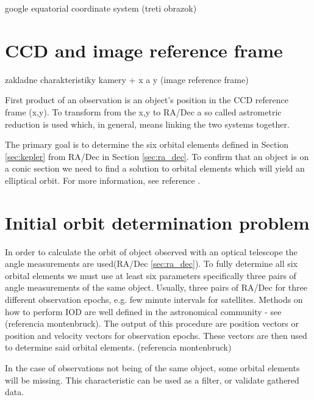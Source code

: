 google	equatorial coordinate system (treti obrazok)

\section{CCD and image reference frame}\label{sec:ccd}
zakladne charakteristiky kamery + x a y (image reference frame)

	First product of an observation is an object's position in the CCD reference frame (x,y). To transform from the x,y to RA/Dec a so called astrometric reduction is used which, in general, means linking the two systems together. 
	
	The primary goal is to determine the six orbital elements defined in Section \ref{sec:kepler} from RA/Dec in Section \ref{sec:ra_dec}. To confirm that an object is on a conic section we need to find a solution to orbital elements which will yield an elliptical orbit. For more information, see reference .
	
\section{Initial orbit determination problem}\label{sec:init_orbit_det}
	
	In order to calculate the orbit of object observed with an optical telescope the angle measurements are used(RA/Dec \ref{sec:ra_dec}). To fully determine all six orbital elements we must use at least six parameters  specifically three pairs of angle measurements of the same object. Usually, three pairs of RA/Dec for three different observation epochs, e.g. few minute intervals for satellites. Methods on how to perform IOD are well defined in the astronomical community - see (referencia montenbruck). The output of this procedure are position vectors or position and velocity vectors for observation epochs. These vectors are then used to determine said orbital elements. (referencia montenbruck)
	
	In the case of observations not being of the same object, some orbital elements will be missing. This characteristic can be used as a filter, or validate gathered data.